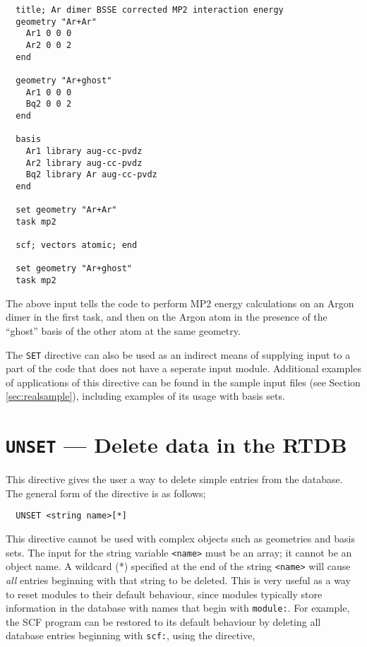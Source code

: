 \begin{verbatim}
  title; Ar dimer BSSE corrected MP2 interaction energy
  geometry "Ar+Ar"
    Ar1 0 0 0
    Ar2 0 0 2
  end

  geometry "Ar+ghost"
    Ar1 0 0 0
    Bq2 0 0 2
  end

  basis
    Ar1 library aug-cc-pvdz
    Ar2 library aug-cc-pvdz
    Bq2 library Ar aug-cc-pvdz
  end

  set geometry "Ar+Ar"
  task mp2 

  scf; vectors atomic; end

  set geometry "Ar+ghost"
  task mp2 
\end{verbatim}

The above input tells the code to perform MP2 energy calculations 
on an Argon dimer in the first task, and then
on the Argon atom in the presence of the ``ghost'' basis of the other
atom at the same geometry.

The \verb+SET+ directive can also be used as an indirect means of
supplying input to a part of the code that does not have a seperate input module.  
Additional examples of applications of this
directive can be found in the sample input files (see Section 
\ref{sec:realsample}), including examples of its usage with basis sets.

\section{{\tt UNSET} --- Delete data in the RTDB}
\label{sec:unset}

This directive gives the user a way to delete simple entries from the
database.  The general form of the directive is as follows;

\begin{verbatim}
  UNSET <string name>[*]
\end{verbatim}

This directive cannot be used with complex objects such as geometries
and basis sets.  The input for the string variable \verb+<name>+ must 
be an array; it cannot be an
object name.  A wildcard (*) specified at the end of the string
\verb+<name>+ will cause {\em all} entries beginning with that string to
be deleted.  This is very useful as a way to reset modules to their
default behaviour, since modules typically store information in the
database with names that begin with \verb+module:+.
For example, the SCF program can be restored to its default behaviour by
deleting all database entries beginning with \verb+scf:+, using the directive,

